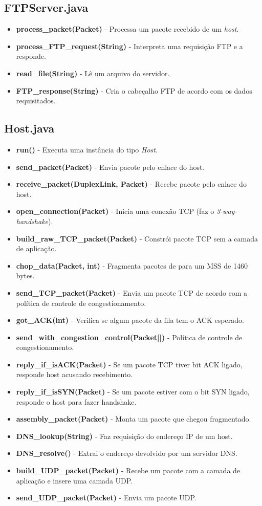 \documentclass[11pt]{article}
\begin{document}
\subsection{FTPServer.java}

\begin{itemize}
	\item \textbf{process\_packet(Packet)} - Processa um pacote recebido de um \textit{host}.
	\item \textbf{process\_FTP\_request(String)} - Interpreta uma requisição FTP e a responde.
	\item \textbf{read\_file(String)} - Lê um arquivo do servidor.
	\item \textbf{FTP\_response(String)} - Cria o cabeçalho FTP de acordo com os dados requisitados.
\end{itemize}

\subsection{Host.java}

\begin{itemize}
	\item \textbf{run()} - Executa uma instância do tipo \textit{Host}.
	\item \textbf{send\_packet(Packet)} - Envia pacote pelo enlace do host.
	\item \textbf{receive\_packet(DuplexLink, Packet)} - Recebe pacote pelo enlace do host.
	\item \textbf{open\_connection(Packet)} - Inicia uma conexão TCP (faz o \textit{3-way-handshake}).
	\item \textbf{build\_raw\_TCP\_packet(Packet)} - Constrói pacote TCP sem a camada de aplicação.
	\item \textbf{chop\_data(Packet, int)} - Fragmenta pacotes de para um MSS de 1460 bytes.
	\item \textbf{send\_TCP\_packet(Packet)} - Envia um pacote TCP de acordo com a política de controle de congestionamento.
	\item \textbf{got\_ACK(int)} - Verifica se algum pacote da fila tem o ACK esperado.
	\item \textbf{send\_with\_congestion\_control(Packet[])} - Política de controle de congestionamento.
	\item \textbf{reply\_if\_isACK(Packet)} - Se um pacote TCP tiver bit ACK ligado, responde host acusando recebimento.
	\item \textbf{reply\_if\_isSYN(Packet)} - Se um pacote estiver com o bit SYN ligado, responde o host para fazer handshake.
	\item \textbf{assembly\_packet(Packet)} - Monta um pacote que chegou fragmentado.
	\item \textbf{DNS\_lookup(String)} - Faz requisição do endereço IP de um host.
	\item \textbf{DNS\_resolve()} - Extrai o endereço devolvido por um servidor DNS.
	\item \textbf{build\_UDP\_packet(Packet)} - Recebe um pacote com a camada de aplicação e insere uma camada UDP.
	\item \textbf{send\_UDP\_packet(Packet)} - Envia um pacote UDP.
\end{itemize}
\end{document}
